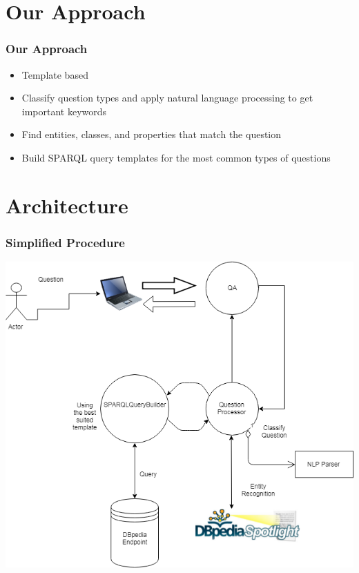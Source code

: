 \documentclass{beamer}
\begin{document}
\section{Our Approach}

\begin{frame}
\frametitle{Our Approach}
\begin{itemize}
	\item Template based
	\item Classify question types and apply natural language processing to get important keywords
	\item Find entities, classes, and properties that match the question
	\item Build SPARQL query templates for the most common types of questions 
\end{itemize}
\end{frame}

\section{Architecture}

\begin{frame}
\frametitle{Simplified Procedure}
\begin{center}
	\includegraphics[scale=0.385]{Architecture.PNG}
\end{center}
\end{frame}
\end{document}
